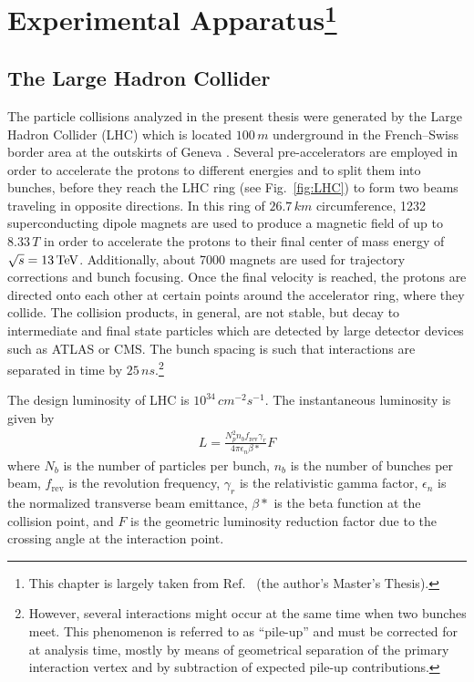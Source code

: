 \chapter[Experimental Apparatus]{Experimental Apparatus\protect\footnote{This chapter is largely taken from Ref.~\cite{Thomassen2012} (the author's Master's Thesis).}}
\label{chap:Detector}

\section{The Large Hadron Collider}
The particle collisions analyzed in the present thesis were generated by the Large Hadron Collider (LHC) which is located $100\,\unit{m}$ underground in the French--Swiss border area at the outskirts of Geneva \cite{1748-0221-3-08-S08001}. Several pre-accelerators are employed in order to accelerate the protons to different energies and to split them into bunches, before they reach the LHC ring (see Fig.~\ref{fig:LHC}) to form two beams traveling in opposite directions. In this ring of $26.7\,\unit{km}$ circumference, 1232 superconducting dipole magnets are used to produce a magnetic field of up to $8.33\,\unit{T}$ in order to accelerate the protons to their final center of mass energy of $\sqrt{s} = 13\,\text{Te\hspace{-.08em}V}$.
Additionally, about 7000 magnets are used for trajectory corrections and bunch focusing. Once the final velocity is reached, the protons are directed onto each other at certain points around the accelerator ring, where they collide. The collision products, in general, are not stable, but decay to intermediate and final state particles which are detected by large detector devices such as ATLAS or CMS. The bunch spacing is such that interactions are separated in time by $25\,\unit{ns}$.\footnote{However, several interactions might occur at the same time when two bunches meet. This phenomenon is referred to as ``pile-up'' and must be corrected for at analysis time, mostly by means of geometrical separation of the primary interaction vertex and by subtraction of expected pile-up contributions.}

The design luminosity of LHC is $10^{34}\,\unit{cm^{-2}s^{-1}}$. The instantaneous luminosity is given by
\begin{eqnarray}
	L = \frac{N_p^2 n_b f_\text{rev} \gamma_r}{4\pi \epsilon_n \beta*} F
\end{eqnarray}
where $N_b$ is the number of particles per bunch, $n_b$ is the number of bunches per beam, $f_\text{rev}$ is the revolution frequency, $\gamma_r$ is the relativistic gamma factor, $\epsilon_n$ is the normalized transverse beam emittance, $\beta*$ is the beta function at the collision point, and $F$ is the geometric luminosity reduction factor due to the crossing angle at the interaction point.

